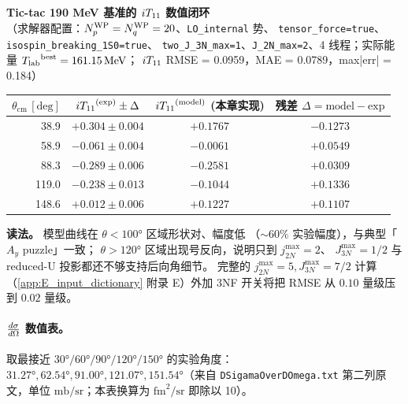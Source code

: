 \begin{numericalbox}
\textbf{Tic-tac 190 MeV 基准的 \({i T_{11}}\) 数值闭环}\\[4pt]
（求解器配置：\({N_{p}^{\text{WP}}}={N_{q}^{\text{WP}}}=20\)、\texttt{LO\_internal} 势、
\texttt{tensor\_force=true}、\texttt{isospin\_breaking\_1S0=true}、
\texttt{two\_J\_3N\_max=1}、\texttt{J\_2N\_max=2}、4 线程；实际能量
\({T_{\text{lab}}}^{\text{best}} = 161.15\,\text{MeV}\)；
\({i T_{11}}\) RMSE = 0.0959，MAE = 0.0789，max|err| = 0.184）
\begin{center}
\begin{tabular}{rccc}
\toprule
\(\theta_{\text{cm}}\,[\text{deg}]\)
& \({i T_{11}}^{(\text{exp})} \pm \Delta\)
& \({i T_{11}}^{(\text{model})}\) (本章实现)
& 残差 \(\Delta = \text{model} - \text{exp}\) \\
\midrule
38.9  & \(+0.304 \pm 0.004\) & \(+0.1767\) & \(-0.1273\) \\
58.9  & \(-0.061 \pm 0.004\) & \(-0.0061\) & \(+0.0549\) \\
88.3  & \(-0.289 \pm 0.006\) & \(-0.2581\) & \(+0.0309\) \\
119.0 & \(-0.238 \pm 0.013\) & \(-0.1044\) & \(+0.1336\) \\
148.6 & \(+0.012 \pm 0.006\) & \(+0.1227\) & \(+0.1107\) \\
\bottomrule
\end{tabular}
\end{center}

\textbf{读法。} 模型曲线在 \(\theta < 100°\) 区域形状对、幅度低
（\(\sim 60\%\) 实验幅度），与典型「\(A_y\) puzzle」一致；
\(\theta > 120°\) 区域出现号反向，说明只到 \(j_{2N}^{\max} = 2\)、
\(J_{3N}^{\max} = 1/2\) 与 reduced-U 投影都还不够支持后向角细节。
完整的 \(j_{2N}^{\max} = 5,
J_{3N}^{\max} = 7/2\) 计算（\cref{app:E_input_dictionary} 附录 E）外加 3NF 开关将把
RMSE 从 \(0.10\) 量级压到 \(0.02\) 量级。
\end{numericalbox}

\paragraph{\(\frac{d\sigma}{d\Omega}\) 数值表。}
取最接近 \(30°/60°/90°/120°/150°\) 的实验角度：
\(31.27°, 62.54°, 91.00°, 121.07°, 151.54°\)（来自
\texttt{DSigamaOverDOmega.txt} 第二列原文，单位
\(\text{mb}/\text{sr}\)；本表换算为 \(\text{fm}^2/\text{sr}\)
即除以 10）。

